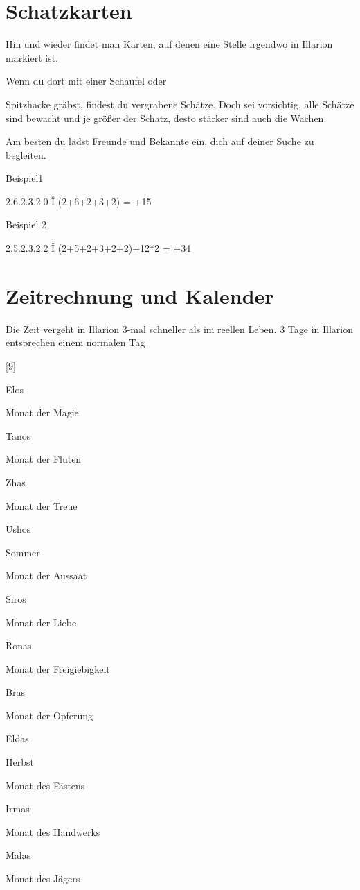 \documentclass[a4paper,11pt]{book}
\begin{document}
\section{Schatzkarten}

Hin und wieder findet man Karten, auf denen eine Stelle irgendwo in Illarion markiert ist.

Wenn du dort mit einer Schaufel oder

Spitzhacke gräbst, findest du vergrabene Schätze. Doch sei vorsichtig, alle Schätze sind bewacht und je größer der Schatz, desto stärker sind auch die Wachen.

Am besten du lädst Freunde und Bekannte ein, dich auf deiner Suche zu begleiten.

Beispiel1

2.6.2.3.2.0  Î (2+6+2+3+2) = +15%

Beispiel 2

2.5.2.3.2.2  Î (2+5+2+3+2+2)+12*2 = +34%

\section{Zeitrechnung und Kalender}

Die Zeit vergeht in Illarion 3-mal schneller als im reellen Leben. 3 Tage in Illarion entsprechen einem normalen Tag

[9]

Elos

Monat der Magie

Tanos

Monat der Fluten

Zhas

Monat der Treue

Ushos

Sommer

Monat der Aussaat

Siros

Monat der Liebe

Ronas

Monat der Freigiebigkeit

Bras

Monat der Opferung

Eldas

Herbst

Monat des Fastens

Irmas

Monat des Handwerks

Malas

Monat des Jägers
\end{document}
